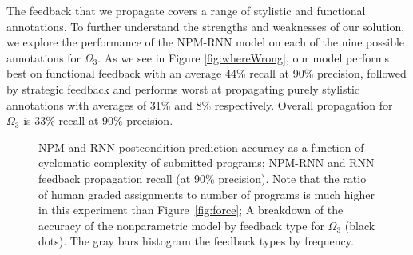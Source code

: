 The feedback that we propagate covers a range of stylistic and functional annotations. To further understand the strengths and weaknesses of our solution, we explore the performance of the NPM-RNN model on each of the nine possible annotations for $\Omega_3$. As we see in Figure \ref{fig:whereWrong},
our model performs best on functional feedback with an average 44\% recall at 90\% precision, followed by strategic feedback and performs worst at propagating purely stylistic annotations with averages of 31\% and 8\% respectively.  Overall propagation for $\Omega_3$ is 33\% recall at 90\% precision. 


\begin{figure}[t]
\centering
{}
\caption[Accuracy as a function of complexity]{
 NPM and RNN postcondition prediction accuracy
as a function of cyclomatic complexity of submitted programs;
NPM-RNN and RNN
feedback propagation recall (at 90\% precision). Note that the ratio of human graded assignments to number of programs is much higher in this experiment than Figure~\ref{fig:force}; 
 A breakdown of the accuracy of the nonparametric model
by feedback type for $\Omega_3$ (black dots).  The gray bars histogram
the feedback types by frequency.
}
\label{fig:cyclomatic}
\end{figure}


